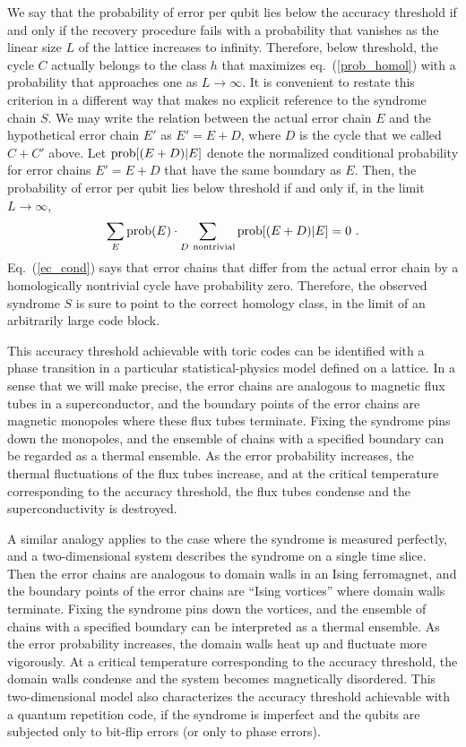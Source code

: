 We say that the probability of error per qubit lies below the accuracy threshold if and only if 
the recovery procedure fails with a probability that vanishes as the linear size $L$ of the lattice increases to infinity. Therefore, below threshold, the cycle $C$ actually belongs to the class $h$ that maximizes eq.~(\ref{prob_homol}) with a probability that approaches one as $L\to\infty$. It is convenient to restate this criterion in a different way that makes no explicit reference to the syndrome chain $S$. We may write the relation between the actual error chain $E$ and the hypothetical error chain $E'$ as $E'=E+D$, where $D$ is the cycle that we called $C+C'$ above. Let ${\rm prob}[(E+D)|E]$ denote the normalized conditional probability for error chains $E'=E+D$ that have the same boundary as $E$.  Then, the probability of error per qubit lies below threshold if and only if, in the limit $L\to \infty$,
\begin{equation}
\sum_E {\rm prob}(E)\cdot \sum_{D~{\rm nontrivial}} {\rm prob}[(E+D)|E]=0~.
\label{ec_cond}
\end{equation}
Eq.~(\ref{ec_cond}) says that error chains that differ from the actual error chain by a homologically nontrivial cycle have probability zero. Therefore, the observed syndrome $S$ is sure to point to the correct homology class, in the limit of an arbitrarily large code block.

This accuracy threshold achievable with toric codes can be identified with a phase transition in a particular statistical-physics model defined on a lattice. In a sense that we will make precise, the error chains are analogous to magnetic flux tubes in a superconductor, and the boundary points of the error chains are magnetic monopoles where these flux tubes terminate. Fixing the syndrome pins down the monopoles, and the ensemble of chains with a specified boundary can be regarded as a thermal ensemble. As the error probability increases, the thermal fluctuations of the flux tubes increase, and at the critical temperature corresponding to the accuracy threshold, the flux tubes condense and the superconductivity is destroyed. 

A similar analogy applies to the case where the syndrome is measured perfectly, and a two-dimensional system describes the syndrome on a single time slice. Then the error chains are analogous to domain walls in an Ising ferromagnet, and the boundary points of the error chains are ``Ising vortices'' where domain walls terminate.  Fixing the syndrome pins down the vortices, and the ensemble of chains with a specified boundary can be interpreted as a thermal ensemble. As the error probability increases, the domain walls heat up and fluctuate more vigorously. At a critical temperature corresponding to the accuracy threshold, the domain walls condense and the system becomes magnetically disordered. This two-dimensional model also characterizes the accuracy threshold achievable with a quantum repetition code, if the syndrome is imperfect and the qubits are subjected only to bit-flip errors (or only to phase errors). 

